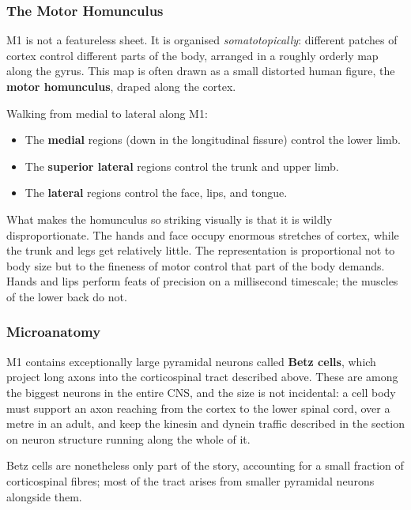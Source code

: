 \documentclass[11pt]{article}
\begin{document}
\subsubsection{The Motor Homunculus}

M1 is not a featureless sheet. It is organised \textit{somatotopically}: different patches of cortex control different parts of the body, arranged in a roughly orderly map along the gyrus. This map is often drawn as a small distorted human figure, the \textbf{motor homunculus}, draped along the cortex.

Walking from medial to lateral along M1:

\begin{itemize}
    \item The \textbf{medial} regions (down in the longitudinal fissure) control the lower limb.
    \item The \textbf{superior lateral} regions control the trunk and upper limb.
    \item The \textbf{lateral} regions control the face, lips, and tongue.
\end{itemize}

What makes the homunculus so striking visually is that it is wildly disproportionate. The hands and face occupy enormous stretches of cortex, while the trunk and legs get relatively little. The representation is proportional not to body size but to the fineness of motor control that part of the body demands. Hands and lips perform feats of precision on a millisecond timescale; the muscles of the lower back do not.

\subsubsection{Microanatomy}

M1 contains exceptionally large pyramidal neurons called \textbf{Betz cells}, which project long axons into the corticospinal tract described above. These are among the biggest neurons in the entire CNS, and the size is not incidental: a cell body must support an axon reaching from the cortex to the lower spinal cord, over a metre in an adult, and keep the kinesin and dynein traffic described in the section on neuron structure running along the whole of it.

Betz cells are nonetheless only part of the story, accounting for a small fraction of corticospinal fibres; most of the tract arises from smaller pyramidal neurons alongside them.
\end{document}
